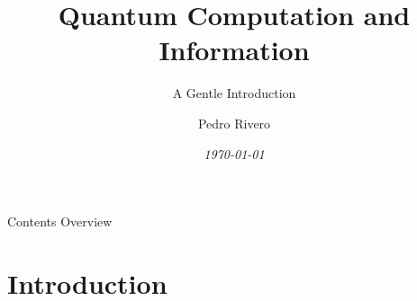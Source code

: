 \documentclass[9pt, handout, aspectratio=169]{beamer}		%
\title{Quantum Computation and Information}
\subtitle{A Gentle Introduction}
\author{Pedro Rivero}
\date{\emph{\small{\today}}}
\institute{Argonne National Laboratory\\ Illinois Institute of Technology\\
\href{mailto:\mail}{\nolinkurl{\mail}}}
\begin{document}
\justify
\setlength{\abovedisplayskip}{0pt}
\setlength{\belowdisplayskip}{12pt}
\setlength{\abovedisplayshortskip}{0pt}
\setlength{\belowdisplayshortskip}{12pt}

	\begin{frame}[plain,t]
		\titlepage
	\end{frame}

	\begin{frame}[c]{Contents Overview}
		\tableofcontents
	\end{frame}


\section{Introduction} 
\end{document}
